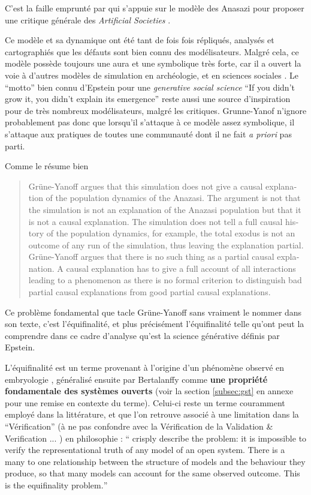 C'est la faille emprunté par \textcite{Yanoff2008} qui s'appuie sur le modèle des Anasazi \autocites{Dean2000, Epstein2002} pour proposer une critique générale des \textit{Artificial Societies} .

Ce modèle et sa dynamique ont été tant de fois fois répliqués, analysés et cartographiés que les défauts sont bien connu des modélisateurs. Malgré cela, ce modèle possède toujours une aura et une symbolique très forte, car il a ouvert la voie à d'autres modèles de simulation en archéologie, et en sciences sociales \autocites{Janssen2009, Stonedahl2010, Schmitt2013}[151]{Schmitt2014}. Le \enquote{motto} bien connu d'Epstein pour une \textit{generative social science} \foreignquote{english}{If you didn't grow it, you didn't explain its emergence} \autocites{Epstein1996} reste aussi une source d'inspiration pour de très nombreux modélisateurs, malgré les critiques. Grunne-Yanof n'ignore probablement pas donc que lorsqu'il s'attaque à ce modèle assez symbolique, il s'attaque aux pratiques de toutes une communauté dont il ne fait \textit{a priori} pas parti. 

Comme le résume bien \textcite{Elsenbroich2012} \foreignblockquote{english}[\cite{Elsenbroich2012}]{Grüne-Yanoff argues that this simulation does not give a causal explanation of the population dynamics of the Anazasi. The argument is not that the simulation is not an explanation of the Anazasi population but that it is not a causal explanation. The simulation does not tell a full causal history of the population dynamics, for example, the total exodus is not an outcome of any run of the simulation, thus leaving the explanation partial. Grüne-Yanoff argues that there is no such thing as a partial causal explanation. A causal explanation has to give a full account of all interactions leading to a phenomenon as there is no formal criterion to distinguish bad partial causal explanations from good partial causal explanations.}

Ce problème fondamental que tacle Grüne-Yanoff sans vraiment le nommer dans son texte, c'est l'équifinalité, et plus précisément l'équifinalité telle qu'ont peut la comprendre dans ce cadre d'analyse qu'est la science générative définis par Epstein.

L'équifinalité est un terme provenant à l'origine d'un phénomène observé en embryologie , généralisé ensuite par Bertalanffy comme \textbf{une propriété fondamentale des systèmes ouverts} (voir la section \ref{subsec:gst} en annexe pour une remise en contexte du terme). Celui-ci reste un terme couramment employé dans la littérature, et que l'on retrouve associé à une limitation dans la \enquote{Vérification} (à ne pas confondre avec la Vérification de la Validation \& Verification ... \autocite{David2009})  en philosophie : \foreignquote{english}{\textcite{Oreske1994} crisply describe the problem: it is impossible to verify the representational truth of any model of an open system. There is a many to one relationship between the structure of models and the behaviour they produce, so that many models can account for the same observed outcome. This is the equifinality problem.} \autocite{OSullivan2004}

